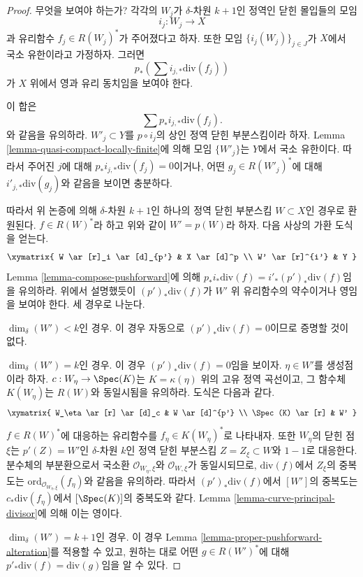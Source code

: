 \begin{proof}
무엇을 보여야 하는가? 각각의 $W_j$가 $\delta$-차원 $k + 1$인 정역인
닫힌 몰입들의 모임
$$
i_j : W_j \longrightarrow X
$$
과 유리함수 $f_j \in R(W_j)^*$가 주어졌다고 하자. 또한 모임
$\{i_j(W_j)\}_{j \in J}$가 $X$에서 국소 유한이라고 가정하자. 그러면
$$
p_*\left(\sum i_{j, *}\text{div}(f_j)\right)
$$
가 $X$ 위에서 영과 유리 동치임을 보여야 한다.

\medskip\noindent
이 합은
$$
\sum p_*i_{j, *}\text{div}(f_j).
$$
와 같음을 유의하라. $W'_j \subset Y$를 $p \circ i_j$의 상인 정역 닫힌
부분스킴이라 하자. Lemma \ref{lemma-quasi-compact-locally-finite}에
의해 모임 $\{W'_j\}$는 $Y$에서 국소 유한이다. 따라서 주어진 $j$에
대해 $p_*i_{j, *}\text{div}(f_j) = 0$이거나, 어떤
$g_j \in R(W'_j)^*$에 대해 $i'_{j, *}\text{div}(g_j)$와 같음을 보이면
충분하다.

\medskip\noindent
따라서 위 논증에 의해 $\delta$-차원 $k + 1$인 하나의 정역 닫힌
부분스킴 $W \subset X$인 경우로 환원된다. $f \in R(W)^*$라 하고
위와 같이 $W' = p(W)$라 하자. 다음 사상의 가환 도식을 얻는다.
$$
\xymatrix{
W \ar[r]_i \ar[d]_{p'} & X \ar[d]^p \\
W' \ar[r]^{i'} & Y
}
$$
Lemma \ref{lemma-compose-pushforward}에 의해
$p_*i_*\text{div}(f) = i'_*(p')_*\text{div}(f)$임을 유의하라. 위에서
설명했듯이 $(p')_*\text{div}(f)$가 $W'$ 위 유리함수의 약수이거나
영임을 보여야 한다. 세 경우로 나눈다.

\medskip\noindent
$\dim_\delta(W') < k$인 경우. 이 경우 자동으로
$(p')_*\text{div}(f) = 0$이므로 증명할 것이 없다.

\medskip\noindent
$\dim_\delta(W') = k$인 경우. 이 경우
$(p')_*\text{div}(f) = 0$임을 보이자. $\eta \in W'$를 생성점이라 하자.
$c : W_\eta \to \Spec(K)$는 $K = \kappa(\eta)$ 위의 고유 정역 곡선이고,
그 함수체 $K(W_\eta)$는 $R(W)$와 동일시됨을 유의하라. 도식은 다음과
같다.
$$
\xymatrix{
W_\eta \ar[r] \ar[d]_c & W \ar[d]^{p'} \\
\Spec(K) \ar[r] & W'
}
$$
$f \in R(W)^*$에 대응하는 유리함수를
$f_\eta \in K(W_\eta)^*$로 나타내자. 또한 $W_\eta$의 닫힌 점 $\xi$는
$p'(Z) = W'$인 $\delta$-차원 $k$인 정역 닫힌 부분스킴
$Z = Z_\xi \subset W$와 $1 - 1$로 대응한다. 분수체의 부분환으로서
국소환 $\mathcal{O}_{W_\eta, \xi}$와 $\mathcal{O}_{W, \xi}$가
동일시되므로, $\text{div}(f)$에서 $Z_\xi$의 중복도는
$\text{ord}_{\mathcal{O}_{W_\eta, \xi}}(f_\eta)$와 같음을 유의하라.
따라서 $(p')_*\text{div}(f)$에서 $[W']$의 중복도는
$c_*\text{div}(f_\eta)$에서 $[\Spec(K)]$의 중복도와 같다. Lemma
\ref{lemma-curve-principal-divisor}에 의해 이는 영이다.

\medskip\noindent
$\dim_\delta(W') = k + 1$인 경우. 이 경우 Lemma
\ref{lemma-proper-pushforward-alteration}를 적용할 수 있고, 원하는 대로
어떤 $g \in R(W')^*$에 대해
$p'_*\text{div}(f) = \text{div}(g)$임을 알 수 있다.
\end{proof}















